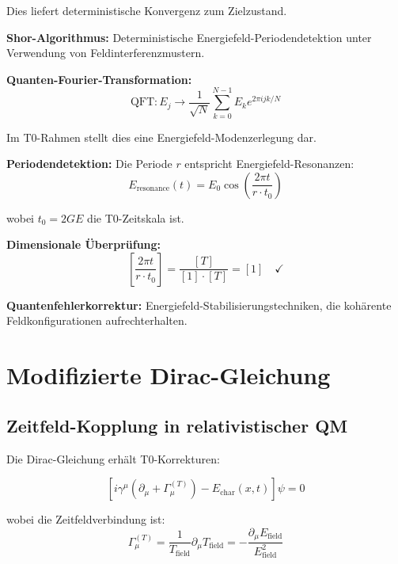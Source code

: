\documentclass[12pt,a4paper]{report}
\begin{document}
	Dies liefert deterministische Konvergenz zum Zielzustand.
	
	\textbf{Shor-Algorithmus:}
	Deterministische Energiefeld-Periodendetektion unter Verwendung von Feldinterferenzmustern.
	
	\textbf{Quanten-Fourier-Transformation:}
	\begin{equation}
		\text{QFT}: E_j \rightarrow \frac{1}{\sqrt{N}} \sum_{k=0}^{N-1} E_k e^{2\pi i jk/N}
	\end{equation}
	
	Im T0-Rahmen stellt dies eine Energiefeld-Modenzerlegung dar.
	
	\textbf{Periodendetektion:}
	Die Periode $r$ entspricht Energiefeld-Resonanzen:
	\begin{equation}
		E_{\text{resonance}}(t) = E_0 \cos\left(\frac{2\pi t}{r \cdot t_0}\right)
	\end{equation}
	
	wobei $t_0 = 2GE$ die T0-Zeitskala ist.
	
	\textbf{Dimensionale Überprüfung:}
	\begin{equation}
		\left[\frac{2\pi t}{r \cdot t_0}\right] = \frac{[T]}{[1] \cdot [T]} = [1] \quad \checkmark
	\end{equation}
	
	\textbf{Quantenfehlerkorrektur:}
	Energiefeld-Stabilisierungstechniken, die kohärente Feldkonfigurationen aufrechterhalten.
	
	\section{Modifizierte Dirac-Gleichung}
	\label{sec:modified_dirac}
	
	\subsection{Zeitfeld-Kopplung in relativistischer QM}
	\label{subsec:dirac_time_field}
	
	Die Dirac-Gleichung erhält T0-Korrekturen:
	
	\begin{equation}
		\left[i\gamma^\mu\left(\partial_\mu + \Gamma_\mu^{(T)}\right) - E_{\text{char}}(x,t)\right]\psi = 0
	\end{equation}
	
	wobei die Zeitfeldverbindung ist:
	\begin{equation}
		\Gamma_\mu^{(T)} = \frac{1}{T_{\text{field}}} \partial_\mu T_{\text{field}} = -\frac{\partial_\mu E_{\text{field}}}{E_{\text{field}}^2}
	\end{equation}
	
\end{document}
